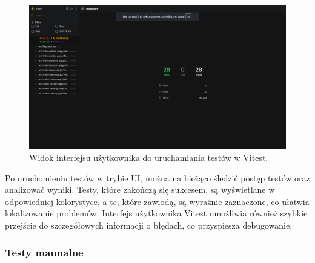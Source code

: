 \documentclass[twoside]{projektInzynierskiMS1}
\begin{document}
\vspace{0.5cm}
\begin{figure}[h!]
    \centering
    \includegraphics[width=1\textwidth]{images/tests_front.png}
    \caption{Widok interfejsu użytkownika do uruchamiania testów w Vitest.}
\end{figure}
\vspace{0.5cm}

\noindent
Po uruchomieniu testów w trybie UI, można na bieżąco śledzić postęp testów oraz analizować wyniki. Testy, które zakończą się sukcesem, są wyświetlane w odpowiedniej kolorystyce, a te, które zawiodą, są wyraźnie zaznaczone, co ułatwia lokalizowanie problemów. Interfejs użytkownika Vitest umożliwia również szybkie przejście do szczegółowych informacji o błędach, co przyspiesza debugowanie.

\newpage

\subsubsection{Testy maunalne}
\end{document}
